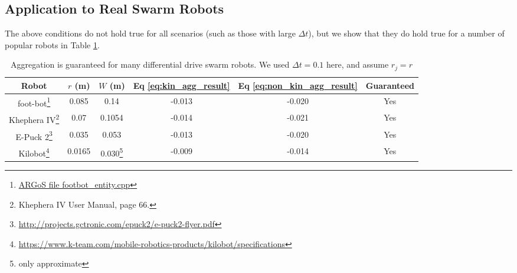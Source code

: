 \documentclass[conference]{IEEEtran}
\begin{document}

    
  \subsection{Application to Real Swarm Robots}

    The above conditions do not hold true for all scenarios (such as those with large $\Delta t$), but we show that they do hold true for a number of popular robots in Table \ref{table:robots}.

    \begin{savenotes}
    \begin{table}
      \centering
      \caption{Aggregation is guaranteed for many differential drive swarm robots. We used $\Delta t=0.1$ here, and assume $r_j=r$}
      \begin{tabular}{|c|c|c|c|c|c|} \hline
        Robot & $r$ (m) & $W$ (m) & Eq \eqref{eq:kin_agg_result}& Eq \eqref{eq:non_kin_agg_result} & Guaranteed \\ \hline
        foot-bot\footnote{\href{https://github.com/ilpincy/argos3/blob/master/src/plugins/robots/foot-bot/simulator/footbot_entity.cpp}{ARGoS file footbot\_entity.cpp}} &
            0.085 & 0.14 & -0.013 & -0.020 & Yes \\ \hline
        Khephera IV\footnote{Khephera IV User Manual, page 66.} &
            0.07 & 0.1054 & -0.014 & -0.021 & Yes \\ \hline
        E-Puck 2\footnote{\href{http://projects.gctronic.com/epuck2/e-puck2-flyer.pdf}{http://projects.gctronic.com/epuck2/e-puck2-flyer.pdf}} &
            0.035 & 0.053 & -0.013 & -0.020 & Yes \\ \hline
        Kilobot\footnote{\href{https://www.k-team.com/mobile-robotics-products/kilobot/specifications}{https://www.k-team.com/mobile-robotics-products/kilobot/specifications}} &
            0.0165 & 0.030\footnote{only approximate} & -0.009 & -0.014 & Yes \\ \hline
      \end{tabular}
      \label{table:robots}
    \end{table}
    \end{savenotes}
\end{document}
